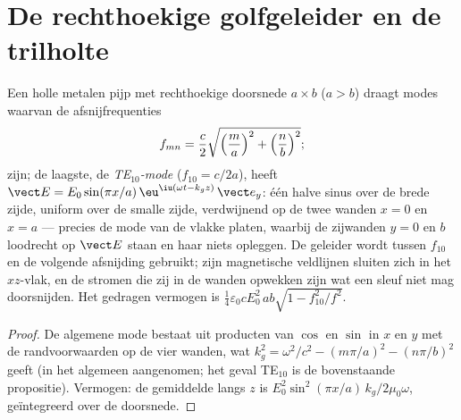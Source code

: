 \section{De rechthoekige golfgeleider en de trilholte}

\begin{proposition}\label{prop:b2:guided-waves:rectangular}
Een holle metalen pijp met rechthoekige doorsnede $a \times b$ ($a > b$)
draagt modes waarvan de afsnijfrequenties
\[
f_{mn} = \frac c2\sqrt{\Bigl(\frac ma\Bigr)^2 + \Bigl(\frac nb\Bigr)^2} ;
\]
zijn; de laagste, de \emph{TE$_{10}$-mode} ($f_{10} = c/2a$), heeft
$\vect E = E_0\sin
(\pi x/a)\,\eu^{\iu(\omega t - k_gz)}\,\vect e_y$: één
halve sinus over de brede zijde, uniform over de smalle zijde, verdwijnend
op de twee wanden $x = 0$ en $x = a$ --- precies de mode van de vlakke
platen, waarbij de zijwanden $y = 0$ en $b$ loodrecht op $\vect E$ staan en
haar niets opleggen. De geleider wordt tussen $f_{10}$ en de volgende
afsnijding gebruikt; zijn magnetische veldlijnen sluiten zich in het
$xz$-vlak, en de stromen die zij in de wanden opwekken zijn wat een sleuf
niet mag doorsnijden. Het gedragen vermogen is
$\tfrac14\varepsilon_0cE_0^2\,ab
\sqrt{1 - f_{10}^2/f^2}$.
\end{proposition}

\begin{proof}
De algemene mode bestaat uit producten van $\cos$ en $\sin$ in $x$ en $y$
met de randvoorwaarden op de vier wanden, wat
$k_g^2 = \omega^2/c^2 - (m\pi/a)^2
- (n\pi/b)^2$ geeft (in het algemeen
aangenomen; het geval TE$_{10}$ is de bovenstaande propositie). Vermogen: de
gemiddelde  langs $z$ is
$E_0^2\sin^2(\pi x/a)
\,k_g/2\mu_0\omega$, geïntegreerd over de doorsnede.
\end{proof}


